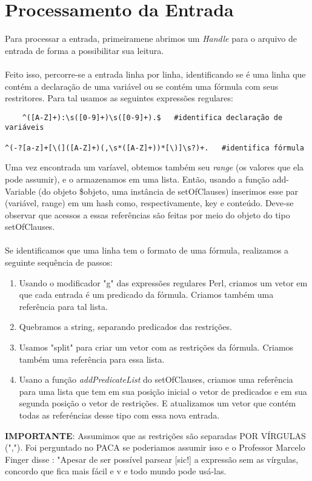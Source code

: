 \documentclass[a4paper]{article}
\begin{document}
\section{Processamento da Entrada}

Para processar a entrada, primeiramene abrimos um \textit{Handle} para o arquivo de entrada de forma a possibilitar sua leitura.\\\\
Feito isso, percorre-se a entrada linha por linha, identificando se é uma linha que contém a declaração de uma variável ou se contém uma fórmula com seus restritores. Para tal usamos as seguintes expressões regulares:
\begin{verbatim}
	^([A-Z]+):\s([0-9]+)\s([0-9]+).$   #identifica declaração de variáveis
    
^(-?[a-z]+[\(]([A-Z]+)(,\s*([A-Z]+))*[\)]\s?)+.   #identifica fórmula
\end{verbatim}

Uma vez encontrada um varíavel, obtemos também seu \textit{range} (os valores que ela pode assumir), e o armazenamos em uma lista. Então, usando a função add-Variable (do objeto \$objeto, uma instância de setOfClauses) inserimos esse par (variável, range) em um hash como, respectivamente, key e conteúdo. Deve-se observar que acessos a essas referências são feitas por meio do objeto do tipo setOfClauses.\\\\
Se identificamos que uma linha tem o formato de uma fórmula, realizamos a seguinte sequência de passos:
\begin{enumerate}
	\item Usando o modificador "g" das expressões regulares Perl, criamos um vetor em que cada entrada é um predicado da fórmula. Criamos também uma referência para tal lista.
    \item Quebramos a string, separando predicados das restrições.
    \item Usamos "split" para criar um vetor com as restrições da fórmula. Criamos também uma referência para essa lista.
    \item Usano a função \textit{addPredicateList} do setOfClauses, criamos uma referência para uma lista que tem em sua posição inicial o vetor de predicados e em sua segunda posição o vetor de restrições. E atualizamos um vetor que contém todas as referéncias desse tipo com essa nova entrada.
\end{enumerate}

\textbf{IMPORTANTE}: Assumimos que as restrições são separadas POR VÍRGULAS (","). Foi perguntado no PACA se poderiamos assumir isso e o Professor Marcelo Finger disse : "Apesar de ser possível parsear [sic!] a expressão sem as vírgulas, concordo que fica mais fácil e v e todo mundo pode usá-las.
\end{document}
